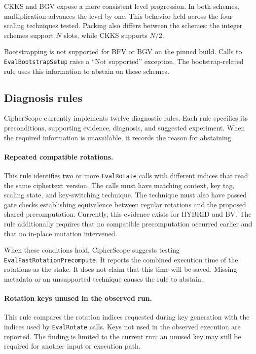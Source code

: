 \documentclass[sigconf,nonacm]{acmart}
\begin{document}
CKKS and BGV expose a more consistent level progression. In both schemes,
multiplication advances the level by one. This behavior held across the four
scaling techniques tested. Packing also differs between the schemes: the
integer schemes support $N$ slots, while CKKS supports $N/2$.

Bootstrapping is not supported for BFV or BGV on the pinned build. Calls to
\texttt{EvalBootstrapSetup} raise a ``Not supported'' exception. The
bootstrap-related rule uses this information to abstain on these schemes.

\subsection{Diagnosis rules}
\label{sec:rules}

CipherScope currently implements twelve diagnostic rules. Each rule specifies
its preconditions, supporting evidence, diagnosis, and suggested experiment.
When the required information is unavailable, it records the reason for
abstaining.

\paragraph{Repeated compatible rotations.} This rule identifies two or more
\texttt{EvalRotate} calls with different indices that read the same
ciphertext version. The calls must have matching context, key tag, scaling
state, and key-switching technique. The technique must also have passed gate
checks establishing equivalence between regular rotations and the proposed
shared precomputation. Currently, this evidence exists for HYBRID and BV. The
rule additionally requires that no compatible precomputation occurred earlier
and that no in-place mutation intervened.

When these conditions hold, CipherScope suggests testing
\texttt{EvalFastRotationPrecompute}. It reports the combined execution time of
the rotations as the stake. It does not claim that this time will be saved.
Missing metadata or an unsupported technique causes the rule to abstain.

\paragraph{Rotation keys unused in the observed run.} This rule compares the
rotation indices requested during key generation with the indices used by
\texttt{EvalRotate} calls. Keys not used in the observed execution are
reported. The finding is limited to the current run: an unused key may still
be required for another input or execution path.
\end{document}
